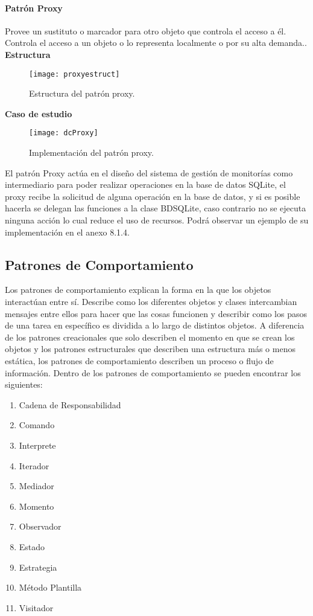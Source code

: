 \paragraph{Patrón Proxy}
Provee un sustituto o marcador para otro objeto que controla el acceso a él. Controla el acceso a un objeto o lo representa localmente o por su alta demanda.\cite{Bol_2014}.
\newline
\indent\textbf{Estructura}
\newline
\begin{figure}[H]
	\centering
	\texttt{[image: proxyestruct]}
    \centering
    \caption{Estructura del patrón proxy.}
	\label{fig:eProxy}
\end{figure}
\indent\textbf{Caso de estudio}
\begin{figure}[H]
	\centering
	\texttt{[image: dcProxy]}
    \centering
    \caption{Implementación del patrón proxy.}
	\label{fig:dcProxy}
\end{figure}
\indent El patrón Proxy actúa en el diseño del sistema de gestión de monitorías como intermediario para poder realizar operaciones en la base de datos SQLite, el proxy recibe la solicitud de alguna operación en la base de datos, y si es posible hacerla se delegan las funciones a la clase BDSQLite, caso contrario no se ejecuta ninguna acción lo cual reduce el uso de recursos. Podrá observar un ejemplo de su implementación en el anexo 8.1.4.
\newpage
\subsection{Patrones de Comportamiento}
Los patrones de comportamiento explican la forma en la que los objetos interactúan entre sí. Describe como los diferentes objetos y clases intercambian mensajes entre ellos para hacer que las cosas funcionen y describir como los pasos de una tarea en específico es dividida a lo largo de distintos objetos. A diferencia de los patrones creacionales que solo describen el momento en que se crean los objetos y los patrones estructurales que describen una estructura más o menos estática, los patrones de comportamiento describen un proceso o flujo de información\cite{behavioral}.
Dentro de los patrones de comportamiento se pueden encontrar los siguientes:
\begin{enumerate}
\item Cadena de Responsabilidad
\item Comando
\item Interprete
\item Iterador
\item Mediador
\item Momento
\item Observador
\item Estado
\item Estrategia
\item Método Plantilla
\item Visitador
\end{enumerate}

